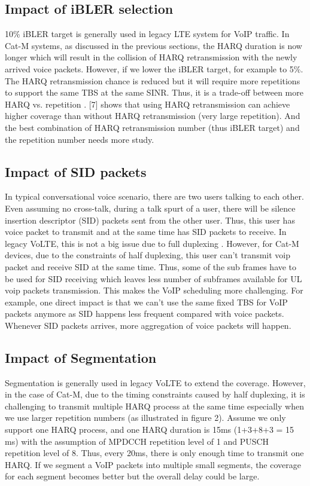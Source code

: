 \documentclass[conference,compsoc]{IEEEtran}
\begin{document}
\subsection{Impact of iBLER selection}
10\% iBLER target is generally used in legacy LTE system for VoIP traffic. In Cat-M systems, as discussed in the previous sections, the HARQ duration is now longer which will result in the collision of HARQ retransmission with the newly arrived voice packets. However, if we lower the iBLER target, for example to 5\%. The HARQ retransmission chance is reduced but it will require more repetitions to support the same TBS at the same SINR. Thus, it is a trade-off between more HARQ vs. repetition  . [7] shows that using HARQ retransmission can achieve higher coverage than without HARQ retransmission (very large repetition). And the best combination of HARQ retransmission number (thus iBLER target) and the repetition number needs more study.

\subsection{Impact of SID packets}
In typical conversational voice scenario, there are two users talking to each other. Even assuming no cross-talk, during a talk spurt of a user, there will be silence insertion descriptor (SID) packets sent from the other user. Thus, this user has voice packet to transmit and at the same time has SID packets to receive. In legacy VoLTE, this is not a big issue due to full duplexing . However, for Cat-M devices, due to the constraints of half duplexing, this user can’t transmit voip packet and receive SID at the same time. Thus, some of the sub frames have to be used for SID receiving which leaves less number of subframes available for UL voip packets transmission. This makes the VoIP scheduling more challenging. For example, one direct impact is that we can’t use the same fixed TBS for VoIP packets anymore as SID happens less frequent compared with voice packets. Whenever SID packets arrives, more aggregation of voice packets will happen.

\subsection{Impact of Segmentation}
Segmentation is generally used in legacy VoLTE to extend the coverage. However, in the case of Cat-M, due to the timing constraints caused by half duplexing, it is challenging to transmit multiple HARQ process at the same time especially when we use larger repetition numbers (as illustrated in figure 2). Assume we only support one HARQ process, and one HARQ duration is 15ms (1+3+8+3 = 15 ms) with the assumption of MPDCCH repetition level of 1 and PUSCH repetition level of 8. Thus, every 20ms, there is only enough time to transmit one HARQ. If we segment a VoIP packets into multiple small segments, the coverage for each segment becomes better but the overall delay could be large.
\end{document}
